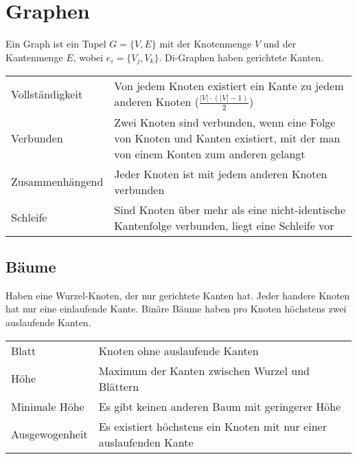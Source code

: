 \section{Graphen}
Ein Graph ist ein Tupel $G = \{V, E\}$ mit der Knotenmenge $V$ und der Kantenmenge $E$, wobei $e_i = \{V_j, V_k\}$.
Di-Graphen haben gerichtete Kanten.

\settowidth{\MyLenA}{Zusammenhängend~~}
\begin{tabular}{@{}p{\the\MyLenA}%
				@{}p{\linewidth-\the\MyLenA}}
	Vollständigkeit & Von jedem Knoten existiert ein Kante zu jedem anderen Knoten ($\frac{|V| \cdot (|V| - 1)}{2}$)\\
	Verbunden & Zwei Knoten sind verbunden, wenn eine Folge von Knoten und Kanten existiert, mit der man von einem
	Konten zum anderen gelangt\\
	Zusammenhängend & Jeder Knoten ist mit jedem anderen Knoten verbunden\\
	Schleife & Sind Knoten über mehr als eine nicht-identische Kantenfolge verbunden, liegt eine Schleife vor\\
\end{tabular}

\subsection{Bäume}
Haben eine Wurzel-Knoten, der nur gerichtete Kanten hat. Jeder handere Knoten hat nur eine einlaufende Kante.
Binäre Bäume haben pro Knoten höchstens zwei auslaufende Kanten.
\settowidth{\MyLenA}{Minimale Höhe~~}
\begin{tabular}{@{}p{\the\MyLenA}%
				@{}p{\linewidth-\the\MyLenA}}
	Blatt & Knoten ohne auslaufende Kanten\\
	Höhe & Maximum der Kanten zwischen Wurzel und Blättern\\
	Minimale Höhe & Es gibt keinen anderen Baum mit geringerer Höhe\\
	Ausgewogenheit & Es existiert höchstens ein Knoten mit nur einer auslaufenden Kante\\
\end{tabular}
